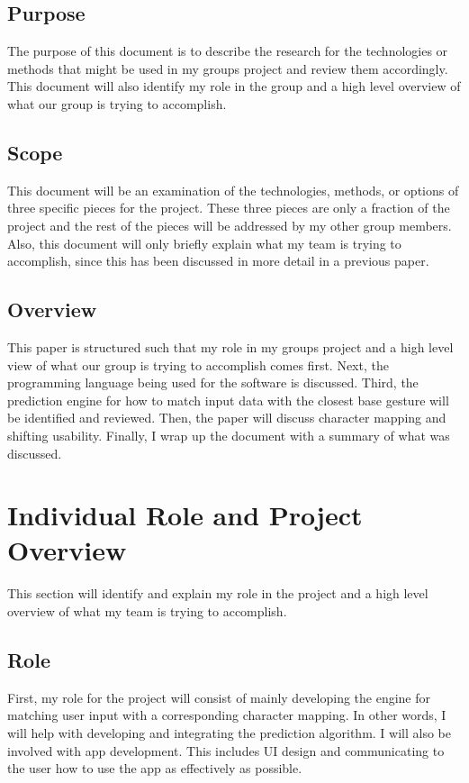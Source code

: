 \documentclass[onecolumn, draftclsnofoot,10pt, journal, letterpaper]{IEEEtran}
\begin{document}
\subsection{Purpose}
        The purpose of this document is to describe the research for the technologies or methods that might be used in my groups project and review them accordingly. This document will also identify my role in the group and a high level overview of what our group is trying to accomplish. 
    \subsection{Scope}
        This document will be an examination of the technologies, methods, or options of three specific pieces for the project. These three pieces are only a fraction of the project and the rest of the pieces will be addressed by my other group members. Also, this document will only briefly explain what my team is trying to accomplish, since this has been discussed in more detail in a previous paper. 
    \subsection{Overview}
        This paper is structured such that my role in my groups project and a high level view of what our group is trying to accomplish comes first. Next, the programming language being used for the software is discussed. Third, the prediction engine for how to match input data with the closest base gesture will be identified and reviewed. Then, the paper will discuss character mapping and shifting usability. Finally, I wrap up the document with a summary of what was discussed.
        
\section{Individual Role and Project Overview}
    This section will identify and explain my role in the project and a high level overview of what my team is trying to accomplish.
    \subsection{Role} 
        First, my role for the project will consist of mainly developing the engine for matching user input with a corresponding character mapping. In other words, I will help with developing and integrating the prediction algorithm. I will also be involved with app development. This includes UI design and communicating to the user how to use the app as effectively as possible. 
    
\end{document}
